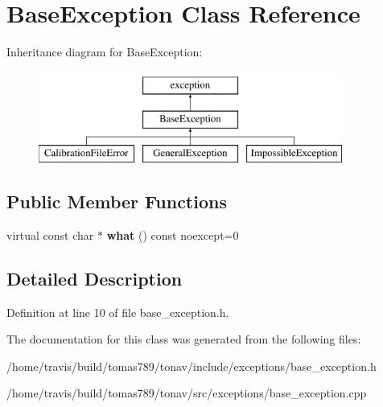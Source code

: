 \hypertarget{class_base_exception}{\section{Base\-Exception Class Reference}
\label{class_base_exception}
}
Inheritance diagram for Base\-Exception\-:\begin{figure}[H]
\begin{center}
\leavevmode
\includegraphics[height=3.000000cm]{class_base_exception}
\end{center}
\end{figure}
\subsection*{Public Member Functions}
\begin{DoxyCompactItemize}
\item 
\hypertarget{class_base_exception_a9a4668c1da76b424a113d600f313b67f}{virtual const char $\ast$ {\bfseries what} () const noexcept=0}\label{class_base_exception_a9a4668c1da76b424a113d600f313b67f}

\end{DoxyCompactItemize}


\subsection{Detailed Description}


Definition at line 10 of file base\-\_\-exception.\-h.



The documentation for this class was generated from the following files\-:\begin{DoxyCompactItemize}
\item 
/home/travis/build/tomas789/tonav/include/exceptions/base\-\_\-exception.\-h\item 
/home/travis/build/tomas789/tonav/src/exceptions/base\-\_\-exception.\-cpp\end{DoxyCompactItemize}
